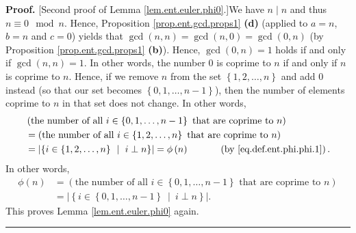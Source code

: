 \documentclass[numbers=enddot,12pt,final,onecolumn,notitlepage]{scrartcl}%
\numberwithin{exer}{subsection}
\theoremstyle{definition}
\newenvironment{proof}[1][Proof]{\noindent\textbf{#1.} }{\ \rule{0.5em}{0.5em}}
\begin{document}
\begin{proof}
[Second proof of Lemma \ref{lem.ent.euler.phi0}.]We have $n \mid n$ and thus
$n \equiv0 \mod n$. Hence, Proposition \ref{prop.ent.gcd.props1} \textbf{(d)}
(applied to $a = n$, $b = n$ and $c = 0$) yields that $\gcd\left(  n, n
\right)  = \gcd\left(  n, 0 \right)  = \gcd\left(  0, n \right)  $ (by
Proposition \ref{prop.ent.gcd.props1} \textbf{(b)}). Hence, $\gcd\left(  0, n
\right)  = 1$ holds if and only if $\gcd\left(  n, n \right)  = 1$. In other
words, the number $0$ is coprime to $n$ if and only if $n$ is coprime to $n$.
Hence, if we remove $n$ from the set $\left\{  1,2,\ldots,n\right\}  $ and add
$0$ instead (so that our set becomes $\left\{  0, 1, \ldots, n-1 \right\}  $),
then the number of elements coprime to $n$ in that set does not change. In
other words,
\begin{align*}
&  \left(  \text{the number of all } i\in\left\{  0,1,\ldots,n-1\right\}
\text{ that are coprime to } n \right) \\
&  = \left(  \text{the number of all } i\in\left\{  1,2,\ldots,n\right\}
\text{ that are coprime to } n \right) \\
&  = \left\vert \left\{  i\in\left\{  1,2,\ldots,n\right\}  \ \mid\ i\perp
n\right\}  \right\vert =\phi\left(  n\right)  \ \ \ \ \ \ \ \ \ \ \left(
\text{by \eqref{eq.def.ent.phi.phi.1}} \right)  .
\end{align*}
In other words,
\begin{align*}
\phi\left(  n \right)   &  = \left(  \text{the number of all } i\in\left\{
0,1,\ldots,n-1\right\}  \text{ that are coprime to } n \right) \\
&  = \left\vert \left\{  i\in\left\{  0,1,\ldots,n-1\right\}  \ \mid\ i\perp
n\right\}  \right\vert .
\end{align*}
This proves Lemma \ref{lem.ent.euler.phi0} again.
\end{proof}
\end{document}
